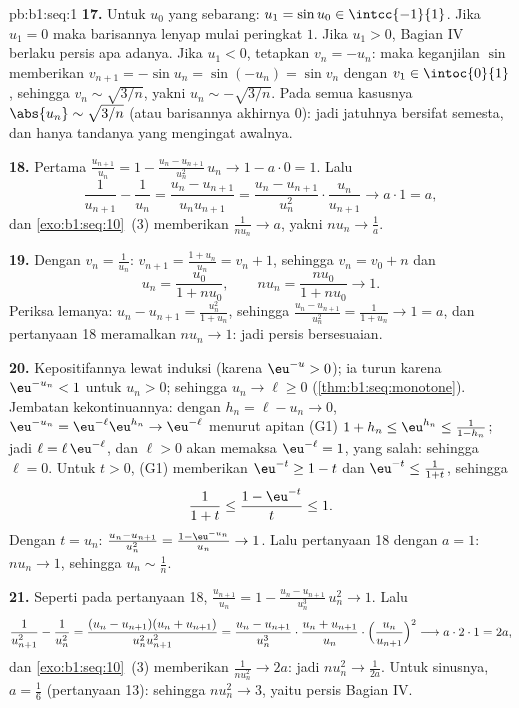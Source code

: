 \begin{solution}{pb:b1:seq:1}
\textbf{17.} Untuk $u_0$ yang sebarang: $u_1 = \sin u_0 \in
\intcc{-1}{1}$. Jika $u_1 = 0$ maka barisannya lenyap mulai peringkat
$1$. Jika $u_1 > 0$, Bagian IV berlaku persis apa adanya. Jika $u_1 < 0$, tetapkan
$v_n = -u_n$: maka keganjilan $\sin$ memberikan $v_{n+1} = -\sin u_n =
\sin(-u_n) = \sin v_n$ dengan $v_1 \in \intoc{0}{1}$, sehingga $v_n \sim
\sqrt{3/n}$, yakni $u_n \sim -\sqrt{3/n}$. Pada semua kasusnya
$\abs{u_n} \sim \sqrt{3/n}$ (atau barisannya akhirnya $0$):
jadi jatuhnya bersifat semesta, dan hanya tandanya yang mengingat awalnya.

\textbf{18.} Pertama $\frac{u_{n+1}}{u_n} = 1 - \frac{u_n -
u_{n+1}}{u_n^2}\,u_n \to 1 - a \cdot 0 = 1$. Lalu
\[
\frac{1}{u_{n+1}} - \frac{1}{u_n}
= \frac{u_n - u_{n+1}}{u_n u_{n+1}}
= \frac{u_n - u_{n+1}}{u_n^2}\cdot\frac{u_n}{u_{n+1}}
\longrightarrow a \cdot 1 = a ,
\]
dan \cref{exo:b1:seq:10}~(3) memberikan $\frac{1}{n u_n} \to a$,
yakni $n u_n \to \frac1a$.

\textbf{19.} Dengan $v_n = \frac{1}{u_n}$: $v_{n+1} = \frac{1 +
u_n}{u_n} = v_n + 1$, sehingga $v_n = v_0 + n$ dan
\[
u_n = \frac{u_0}{1 + n u_0} , \qquad
n u_n = \frac{n u_0}{1 + n u_0} \longrightarrow 1 .
\]
Periksa lemanya: $u_n - u_{n+1} = \frac{u_n^2}{1 + u_n}$, sehingga
$\frac{u_n - u_{n+1}}{u_n^2} = \frac{1}{1 + u_n} \to 1 = a$, dan
pertanyaan 18 meramalkan $n u_n \to 1$: jadi persis bersesuaian.

\textbf{20.} Kepositifannya lewat induksi (karena $\eu^{-u} > 0$);
ia turun karena $\eu^{-u_n} < 1$ untuk $u_n > 0$; sehingga $u_n \to
\ell \geq 0$ (\cref{thm:b1:seq:monotone}). Jembatan kekontinuannya:
dengan $h_n = \ell - u_n \to 0$, $\eu^{-u_n} = \eu^{-\ell}
\eu^{h_n} \to \eu^{-\ell}$ menurut apitan (G1) $1 + h_n \leq
\eu^{h_n} \leq \frac{1}{1 - h_n}$; jadi $\ell = \ell\,
\eu^{-\ell}$, dan $\ell > 0$ akan memaksa $\eu^{-\ell} = 1$,
yang salah: sehingga $\ell = 0$. Untuk $t > 0$, (G1) memberikan $\eu^{-t} \geq 1 - t$
dan $\eu^{-t} \leq \frac{1}{1 + t}$, sehingga
\[
\frac{1}{1 + t} \leq \frac{1 - \eu^{-t}}{t} \leq 1 .
\]
Dengan $t = u_n$: $\frac{u_n - u_{n+1}}{u_n^2} = \frac{1 -
\eu^{-u_n}}{u_n} \to 1$. Lalu pertanyaan 18 dengan $a = 1$: $n u_n \to
1$, sehingga $u_n \sim \frac1n$.

\textbf{21.} Seperti pada pertanyaan 18, $\frac{u_{n+1}}{u_n} = 1 -
\frac{u_n - u_{n+1}}{u_n^3}\,u_n^2 \to 1$. Lalu
\[
\frac{1}{u_{n+1}^2} - \frac{1}{u_n^2}
= \frac{(u_n - u_{n+1})(u_n + u_{n+1})}{u_n^2 u_{n+1}^2}
= \frac{u_n - u_{n+1}}{u_n^3}\cdot
\frac{u_n + u_{n+1}}{u_n}\cdot
\Bigl(\frac{u_n}{u_{n+1}}\Bigr)^2
\longrightarrow a \cdot 2 \cdot 1 = 2a ,
\]
dan \cref{exo:b1:seq:10}~(3) memberikan $\frac{1}{n u_n^2} \to 2a$:
jadi $n u_n^2 \to \frac{1}{2a}$. Untuk sinusnya, $a = \frac16$
(pertanyaan 13): sehingga $n u_n^2 \to 3$, yaitu persis Bagian IV.


\end{solution}
